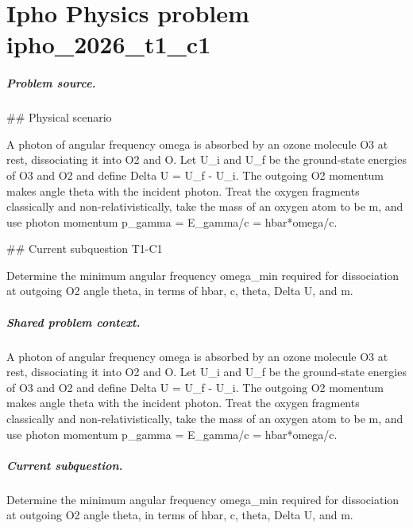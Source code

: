
\chapter{Ipho Physics problem ipho\_2026\_t1\_c1}
\label{ch:IPhO2026Problems_problem_ipho_2026_t1_c1}

\paragraph{Problem source.}
\#\# Physical scenario

A photon of angular frequency omega is absorbed by an ozone molecule O3 at rest,
dissociating it into O2 and O.  Let U\_i and U\_f be the ground-state energies of
O3 and O2 and define Delta U = U\_f - U\_i.  The outgoing O2 momentum makes angle
theta with the incident photon.  Treat the oxygen fragments classically and
non-relativistically, take the mass of an oxygen atom to be m, and use photon
momentum p\_gamma = E\_gamma/c = hbar*omega/c.

\#\# Current subquestion T1-C1

Determine the minimum angular frequency omega\_min required for dissociation at outgoing O2 angle theta, in terms of hbar, c, theta, Delta U, and m.

\paragraph{Shared problem context.}
A photon of angular frequency omega is absorbed by an ozone molecule O3 at rest,
dissociating it into O2 and O.  Let U\_i and U\_f be the ground-state energies of
O3 and O2 and define Delta U = U\_f - U\_i.  The outgoing O2 momentum makes angle
theta with the incident photon.  Treat the oxygen fragments classically and
non-relativistically, take the mass of an oxygen atom to be m, and use photon
momentum p\_gamma = E\_gamma/c = hbar*omega/c.

\paragraph{Current subquestion.}
Determine the minimum angular frequency omega\_min required for dissociation at outgoing O2 angle theta, in terms of hbar, c, theta, Delta U, and m.

